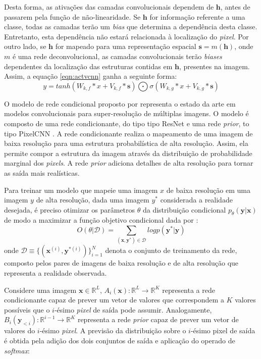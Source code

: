 {Desta forma, as ativações das camadas convolucionais dependem de $\boldsymbol{h}$,
antes de passarem pela função de não-linearidade. Se $\boldsymbol{h}$ for
informação referente a uma classe, todas as camadas terão um \textit{bias} que determina
a dependência desta classe. Entretanto, esta dependência não estará relacionada à
localização do \textit{pixel}. Por outro lado, se $\boldsymbol{h}$ for mapeado
para uma representação espacial $\boldsymbol{s}=m(\boldsymbol{h})$, onde $m$ é uma rede
deconvolucional, as camadas convolucionais terão \textit{biases} dependentes da localização
das estruturas contidas em $\boldsymbol{h}$, presentes na imagem. Assim, a equação \ref{eqn:actvcnn}
ganha a seguinte forma:
\begin{equation}
\label{eqn:actvcnncond}
y = tanh(W_{k,f} * x + V_{k,f}*\boldsymbol{s})\bigodot \sigma(W_{k,g}*x + V_{k,g}*\boldsymbol{s})
\end{equation}

O modelo de rede condicional proposto por \cite{DahlNS17} representa o estado da arte em modelos convolucionais para
super-resolução de múltiplas imagens. O modelo é composto de uma rede condicionante, do tipo tipo ResNet \citep{He2016}
e uma rede \textit{prior}, to tipo PixelCNN \citep{Oord16}.
A rede condicionante realiza o mapeamento de uma imagem de baixa resolução para uma estrutura probabilística
de alta resolução. Assim, ela permite compor a estrutura da imagem através da distribuição
de probabilidade marginal dos \textit{pixels}. A rede \textit{prior} adiciona detalhes de alta resolução
para tornar as saída mais realísticas. 

Para treinar um modelo que mapeie uma imagem $x$ de baixa resolução em uma imagem $y$ de alta resolução,
dada uma imagem $y^*$ considerada a realidade desejada, é preciso otimizar os parâmetros
$\theta$ da distribuição condicional $p_{\theta}(\boldsymbol{y}|\boldsymbol{x})$ de modo
a maximizar a função objetivo condicional dada por \citep{DahlNS17}:
\begin{equation}
\label{eqn:objfunc}
O(\theta|\mathcal{D})= \sum_{(\boldsymbol{x},\boldsymbol{y^*})\in \mathcal{D}} log p(\boldsymbol{y^*}|\boldsymbol{y})
\end{equation}
onde $\mathcal{D} \equiv \{(\boldsymbol{x}^{(i)},\boldsymbol{y}^{*(i)})\}_{i=1}^N$ denota o conjunto
de treinamento da rede, composto pelos pares de imagens de baixa resolução e de alta resolução que representa
a realidade observada.

Considere uma imagem $ \boldsymbol{x} \in \mathbb{R}^L $, $A_i(\boldsymbol{x}) : \mathbb{R}^L \rightarrow \mathbb{R}^K$
representa a rede condicionante capaz de prever um vetor de valores que correspondem a $K$ valores
possíveis que o $i$-ésimo \textit{pixel} de saída pode assumir. Analogamente,
$B_i(\boldsymbol{y}_{<i}) : \mathbb{R}^{i-1} \rightarrow \mathbb{R}^K$ representa a rede \textit{prior}
capaz de prever um vetor de valores do $i$-ésimo \textit{pixel}. A previsão da distribuição
sobre o $i$-ésimo pixel de saída é obtida pela adição dos dois conjuntos de saída e aplicação
do operado de \textit{softmax}:

}
